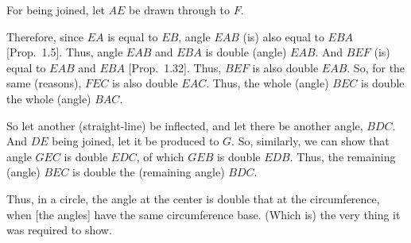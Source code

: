 \begin{Parallel}{}{}
{For being joined, let $AE$ be drawn through to $F$.

Therefore, since $EA$ is equal to $EB$, angle $EAB$ (is) also equal to
$EBA$ [Prop.~1.5]. Thus, angle $EAB$ and $EBA$ is double (angle) $EAB$.
And $BEF$ (is) equal to $EAB$ and $EBA$ [Prop.~1.32]. Thus, $BEF$ is also
double $EAB$. So, for the same (reasons), $FEC$ is also double $EAC$. Thus,
the whole (angle) $BEC$ is double the whole (angle) $BAC$.

\epsfysize=2.2in
\centerline{}

So let another  (straight-line)  be inflected, and let there be another
angle, $BDC$. And $DE$ being joined, let it be produced to $G$.
So, similarly, we can show that angle $GEC$ is double $EDC$, of which
$GEB$ is double $EDB$. Thus, the remaining (angle) $BEC$ is double
the (remaining angle) $BDC$.

Thus, in a circle, the angle at the center is double that at the circumference, when
[the angles] have the same circumference base. (Which is) the very thing it
was required to show.\\}
\end{Parallel}

